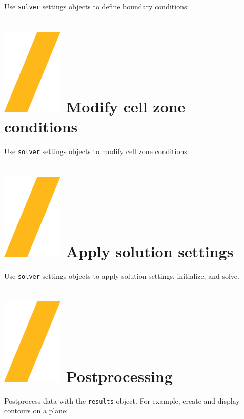 \documentclass[9pt,landscape]{article}
\begin{document}
\begin{multicols}{3}
Use \texttt{solver} settings objects to define boundary conditions:

\vfill
\section{\includegraphics[height=\fontcharht\font`\S]{slash.png}  Modify cell zone conditions} 
Use \texttt{solver} settings objects to modify cell zone conditions.
\vfill

\vfill

\section{\includegraphics[height=\fontcharht\font`\S]{slash.png}  Apply solution settings}
Use \texttt{solver} settings objects to apply solution settings, initialize, and solve.


\section{\includegraphics[height=\fontcharht\font`\S]{slash.png}  Postprocessing}
Postprocess data with the \texttt{results} object. For example, create and display contours on a plane:


\end{multicols}
\end{document}
